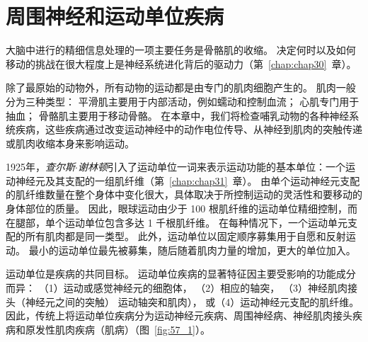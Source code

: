\chapter{周围神经和运动单位疾病} \label{chap:chap57}

大脑中进行的精细信息处理的一项主要任务是骨骼肌的收缩。
决定何时以及如何移动的挑战在很大程度上是神经系统进化背后的驱动力（第~\ref{chap:chap30}~章）。


除了最原始的动物外，所有动物的运动都是由专门的肌肉细胞产生的。
肌肉一般分为三种类型：
平滑肌主要用于内部活动，例如蠕动和控制血流；
心肌专门用于抽血；
骨骼肌主要用于移动骨骼。
在本章中，我们将检查哺乳动物的各种神经系统疾病，这些疾病通过改变运动神经中的动作电位传导、从神经到肌肉的突触传递或肌肉收缩本身来影响运动。


1925年，\textit{查尔斯$\cdot$谢林顿}引入了运动单位一词来表示运动功能的基本单位：一个运动神经元及其支配的一组肌纤维（第~\ref{chap:chap31}~章）。
由单个运动神经元支配的肌纤维数量在整个身体中变化很大，具体取决于所控制运动的灵活性和要移动的身体部位的质量。
因此，眼球运动由少于 100 根肌纤维的运动单位精细控制，而在腿部，单个运动单位包含多达 1 千根肌纤维。
在每种情况下，一个运动单元支配的所有肌肉都是同一类型。
此外，运动单位以固定顺序募集用于自愿和反射运动。
最小的运动单位最先被募集，随后随着肌肉力量的增加，更大的单位加入。


运动单位是疾病的共同目标。
运动单位疾病的显著特征因主要受影响的功能成分而异：
（1）运动或感觉神经元的细胞体，
（2）相应的轴突，
（3）神经肌肉接头（神经元之间的突触） 运动轴突和肌肉），
或（4）运动神经元支配的肌纤维。
因此，传统上将运动单位疾病分为运动神经元疾病、周围神经病、神经肌肉接头疾病和原发性肌肉疾病（肌病）（图~\ref{fig:57_1}）。


